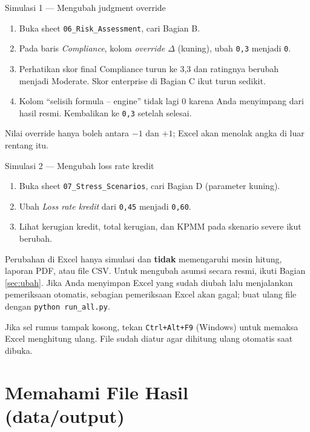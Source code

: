 \documentclass[11pt,a4paper]{article}
\newcommand{\file}[1]{\texttt{\small #1}}
\begin{document}
\begin{stepbox}{Simulasi 1 --- Mengubah judgment override}
\begin{enumerate}
\item Buka sheet \file{06\_\allowbreak{}Risk\_\allowbreak{}Assessment}, cari Bagian B.
\item Pada baris \emph{Compliance}, kolom \emph{override $\Delta$} (kuning), ubah \texttt{0,3} menjadi \texttt{0}.
\item Perhatikan skor final Compliance turun ke 3{,}3 dan ratingnya berubah menjadi Moderate. Skor enterprise di Bagian C ikut turun sedikit.
\item Kolom ``selisih formula -- engine'' tidak lagi 0 karena Anda menyimpang dari hasil resmi. Kembalikan ke \texttt{0,3} setelah selesai.
\end{enumerate}
Nilai override hanya boleh antara $-1$ dan $+1$; Excel akan menolak angka di luar rentang itu.
\end{stepbox}

\begin{stepbox}{Simulasi 2 --- Mengubah loss rate kredit}
\begin{enumerate}
\item Buka sheet \file{07\_\allowbreak{}Stress\_\allowbreak{}Scenarios}, cari Bagian D (parameter kuning).
\item Ubah \emph{Loss rate kredit} dari \texttt{0,45} menjadi \texttt{0,60}.
\item Lihat kerugian kredit, total kerugian, dan KPMM pada skenario severe ikut berubah.
\end{enumerate}
\end{stepbox}

\begin{warnbox}
Perubahan di Excel hanya simulasi dan \textbf{tidak} memengaruhi mesin hitung, laporan PDF, atau file CSV. Untuk mengubah asumsi secara resmi, ikuti Bagian \ref{sec:ubah}. Jika Anda menyimpan Excel yang sudah diubah lalu menjalankan pemeriksaan otomatis, sebagian pemeriksaan Excel akan gagal; buat ulang file dengan \texttt{python run\_\allowbreak{}all.py}.
\end{warnbox}

\begin{infobox}
Jika sel rumus tampak kosong, tekan \texttt{Ctrl+Alt+F9} (Windows) untuk memaksa Excel menghitung ulang. File sudah diatur agar dihitung ulang otomatis saat dibuka.
\end{infobox}
\section{Memahami File Hasil (data/output)}\label{sec:csv}
\end{document}
